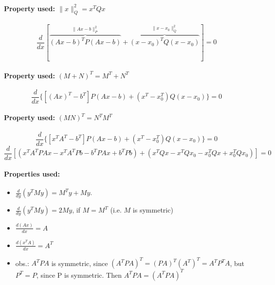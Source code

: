 \documentclass[a4paper]{article}    %
\begin{document}
\paragraph{Property used: $\|x\|_{Q}^{2} = x^{T}Qx$}
    \[\frac{d}{dx} [\overbrace{(Ax-b)^{T} P (Ax-b)}^{\|Ax-b\|_{P}^{2}} + \overbrace{(x-x_0)^T Q (x-x_0)}^{\|x-x_{0}\|_{Q}^{2}}] = 0\]
\paragraph{Property used: $(M + N)^T = M^T + N^T$}
    \[\frac{d}{dx} \{[(Ax)^T-b^T] P (Ax-b) + (x^T-x_0^T) Q (x-x_0)\} = 0\]
\paragraph{Property used: $(MN)^T = N^T M^T$}
    \[\frac{d}{dx} \{[x^TA^T-b^T] P (Ax-b) + (x^T-x_0^T) Q (x-x_0)\} = 0\]
    \[\frac{d}{dx} [(x^TA^TPAx - x^TA^TPb -b^TPAx + b^TPb) + (x^TQx - x^TQx_0 - x_0^TQx + x_0^TQx_0)] = 0\]
\paragraph{Properties used:}
    \begin{itemize}
        \item $\frac{d}{dy}(y^TMy) = M^Ty + My$.
        \item $\frac{d}{dy}(y^TMy) = 2My$, if $M = M^T$ (i.e. $M$ is symmetric)
        \item $\frac{d(Ax)}{dx} = A$
        \item $\frac{d(x^TA)}{dx} = A^T$
        \item obs.: $A^TPA$ is symmetric, since $(A^TPA)^T = (PA)^T(A^T)^T = A^TP^TA$, but $P^T = P$, since P is symmetric. Then $A^TPA = (A^TPA)^T$
    \end{itemize}
\end{document}
